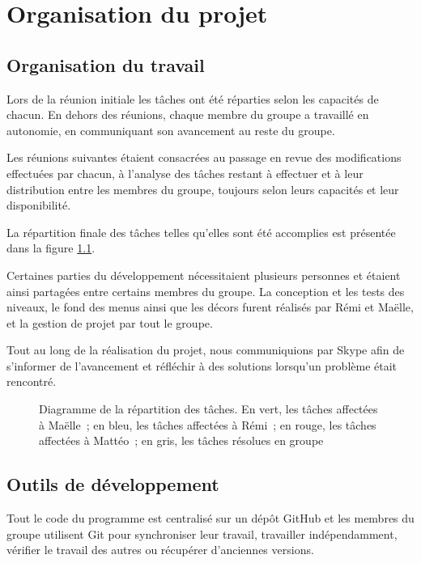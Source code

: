 \chapter{Organisation du projet}

\section{Organisation du travail}

Lors de la réunion initiale les tâches ont été réparties selon les capacités
de chacun. En dehors des réunions, chaque membre du groupe a travaillé en
autonomie, en communiquant son avancement au reste du groupe.

Les réunions suivantes étaient consacrées au passage en revue des modifications
effectuées par chacun, à l'analyse des tâches restant à effectuer et à leur
distribution entre les membres du groupe, toujours selon leurs capacités
et leur disponibilité.

La répartition finale des tâches telles qu'elles sont été accomplies
est présentée dans la figure \ref{fig:organisation-gantt}.

Certaines parties du développement nécessitaient plusieurs personnes et
étaient ainsi partagées entre certains membres du groupe. La conception
et les tests des niveaux, le fond des menus ainsi que les décors furent
réalisés par Rémi et Maëlle, et la gestion de projet par tout le groupe.

Tout au long de la réalisation du projet, nous communiquions par Skype
afin de s'informer de l'avancement et réfléchir à des solutions lorsqu'un
problème était rencontré.

\begin{figure}[p!]
    \centering
    
    \caption{
        Diagramme de la répartition des tâches. En vert, les tâches
        affectées à Maëlle~; en bleu, les tâches affectées à Rémi~;
        en rouge, les tâches affectées à Mattéo~; en gris, les
        tâches résolues en groupe
    }
    \label{fig:organisation-gantt}
\end{figure}
\restoregeometry

\section{Outils de développement}

Tout le code du programme est centralisé sur un dépôt GitHub et les membres
du groupe utilisent Git pour synchroniser leur travail, travailler
indépendamment, vérifier le travail des autres ou récupérer
d'anciennes versions.
\cite{organisation-github-skizzle}

